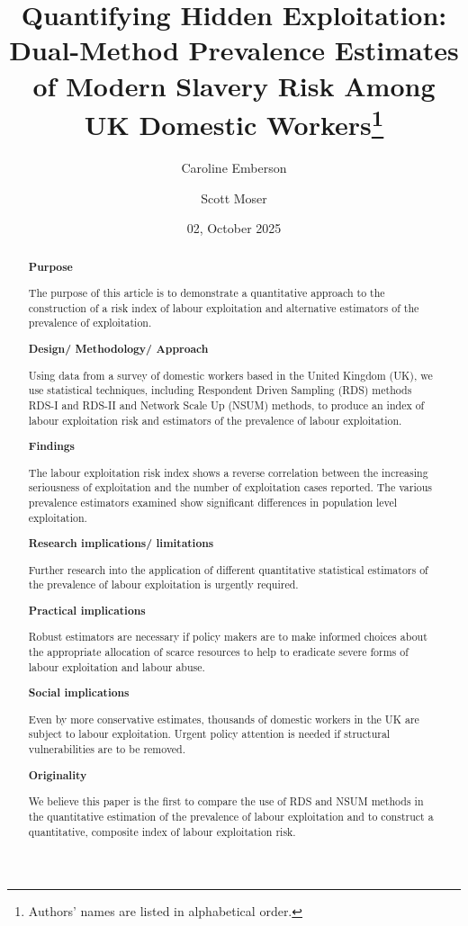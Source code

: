 \documentclass[
  12pt,
  letterpaper,
  DIV=11,
  numbers=noendperiod]{scrartcl}
\title{Quantifying Hidden Exploitation: Dual-Method Prevalence Estimates
of Modern Slavery Risk Among UK Domestic Workers\footnote{Authors' names
  are listed in alphabetical order.}}
\author{Caroline Emberson \and Scott Moser}
\date{02, October 2025}
\theoremstyle{plain}
\theoremstyle{definition}
\begin{document}
\maketitle
\begin{abstract}
\textbf{Purpose}

The purpose of this article is to demonstrate a quantitative approach to
the construction of a risk index of labour exploitation and alternative
estimators of the prevalence of exploitation.

\textbf{Design/ Methodology/ Approach}

Using data from a survey of domestic workers based in the United Kingdom
(UK), we use statistical techniques, including Respondent Driven
Sampling (RDS) methods RDS-I and RDS-II and Network Scale Up (NSUM)
methods, to produce an index of labour exploitation risk and estimators
of the prevalence of labour exploitation.

\textbf{Findings}

The labour exploitation risk index shows a reverse correlation between
the increasing seriousness of exploitation and the number of
exploitation cases reported. The various prevalence estimators examined
show significant differences in population level exploitation.

\textbf{Research implications/ limitations}

Further research into the application of different quantitative
statistical estimators of the prevalence of labour exploitation is
urgently required.

\textbf{Practical implications}

Robust estimators are necessary if policy makers are to make informed
choices about the appropriate allocation of scarce resources to help to
eradicate severe forms of labour exploitation and labour abuse.

\textbf{Social implications}

Even by more conservative estimates, thousands of domestic workers in
the UK are subject to labour exploitation. Urgent policy attention is
needed if structural vulnerabilities are to be removed.

\textbf{Originality}

We believe this paper is the first to compare the use of RDS and NSUM
methods in the quantitative estimation of the prevalence of labour
exploitation and to construct a quantitative, composite index of labour
exploitation risk.
\end{abstract}
\end{document}
